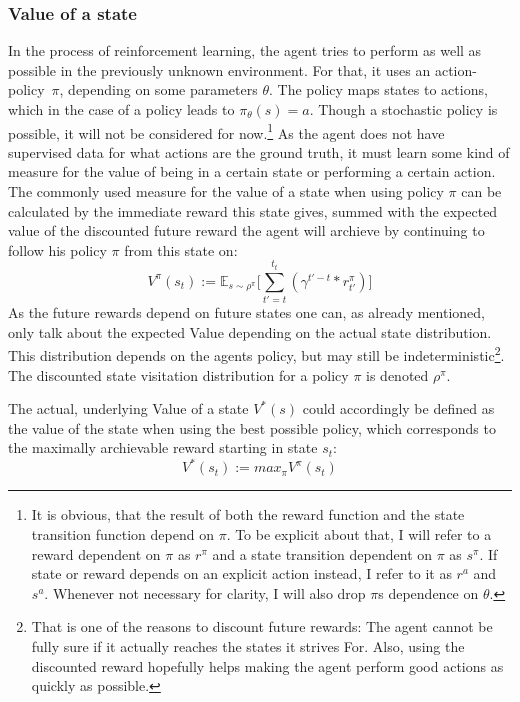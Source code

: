 \subsubsection{Value of a state}
In the process of reinforcement learning, the agent tries to perform as well as possible in the previously unknown environment. For that, it uses an \mbox{action-policy $\pi$,} depending on some parameters $\theta$. The policy maps states to actions, which in the case of a  policy leads to $\pi_\theta(s) = a$. Though a stochastic policy is possible, it will not be considered for now.\footnote{It is obvious, that the result of both the reward function and the state transition function depend on $\pi$. To be explicit about that, I will refer to a reward dependent on $\pi$ as $r^\pi$ and a state transition dependent on $\pi$ as $s^\pi$. If state or reward depends on an explicit action instead, I refer to it as $r^a$ and $s^a$. Whenever not necessary for clarity, I will also drop $\pi$s dependence on $\theta$.} As the agent does not have supervised data for what actions are the ground truth, it must learn some kind of measure for the value of being in a certain state or performing a certain action. The commonly used measure for the value of a state when using policy $\pi$ can be calculated by the immediate reward this state gives, summed with the expected value of the discounted future reward the agent will archieve by continuing to follow his policy $\pi$ from this state on:
\begin{equation} \label{eq:valuedefinition}
	V^\pi(s_t) := \mathds{E}_{s\sim\rho^\pi} \Big[ \sum_{t'=t}^{t_t} ( \gamma^{t'-t} * r^\pi_{t'} ) \Big]
\end{equation}
As the future rewards depend on future states one can, as already mentioned, only talk about the expected Value depending on the actual state distribution. This distribution depends on the agents policy, but may still be indeterministic\footnote{That is one of the reasons to discount future rewards: The agent cannot be fully sure if it actually reaches the states it strives For. Also, using the discounted reward hopefully helps making the agent perform good actions as quickly as possible.}. The discounted state visitation distribution for a policy $\pi$ is denoted $\rho^\pi$.

The actual, underlying Value of a state $V^*(s)$ could accordingly be defined as the value of the state when using the best possible policy, which corresponds to the maximally archievable reward starting in state $s_t$:
\begin{equation*} 
	V^*(s_t) := max_\pi V^\pi(s_t)
\end{equation*}

